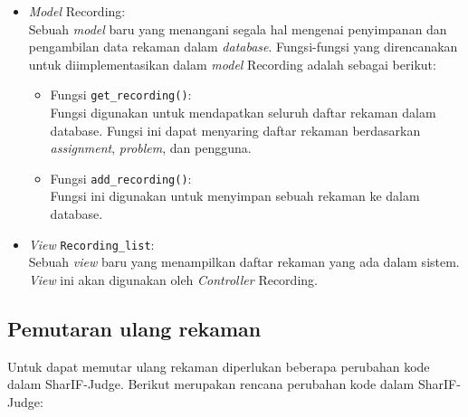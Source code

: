 \begin{itemize}
    \item \textit{Model} Recording: \\
          Sebuah \textit{model} baru yang menangani segala hal mengenai penyimpanan dan pengambilan data rekaman dalam \textit{database}. Fungsi-fungsi yang direncanakan untuk diimplementasikan dalam \textit{model} Recording adalah sebagai berikut:
          \begin{itemize}
              \item Fungsi \verb|get_recording()|: \\
                    Fungsi digunakan untuk mendapatkan seluruh daftar rekaman dalam database. Fungsi ini dapat menyaring daftar rekaman berdasarkan \textit{assignment}, \textit{problem}, dan pengguna.
              \item Fungsi \verb|add_recording()|: \\
                    Fungsi ini digunakan untuk menyimpan sebuah rekaman ke dalam database.
          \end{itemize}
    \item \textit{View} \verb|Recording_list|: \\
          Sebuah \textit{view} baru yang menampilkan daftar rekaman yang ada dalam sistem. \textit{View} ini akan digunakan oleh \textit{Controller} Recording.
\end{itemize}

\subsection{Pemutaran ulang rekaman}

Untuk dapat memutar ulang rekaman diperlukan beberapa perubahan kode dalam SharIF-Judge. Berikut merupakan rencana perubahan kode dalam SharIF-Judge:


